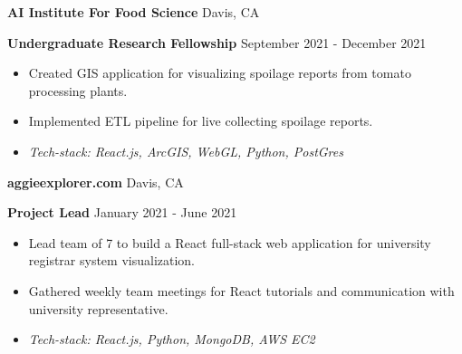 \documentclass[11pt]{article}
\begin{document}
\vspace{8pt}

\textbf{AI Institute For Food Science}	\hfill Davis, CA

\textbf{Undergraduate Research Fellowship} \hfill September 2021 - December 2021
\begin{itemize}[noitemsep, topsep=0pt, partopsep=0pt, parsep=0pt]
    \item Created GIS application for visualizing spoilage reports from tomato processing plants.
    \item Implemented ETL pipeline for live collecting spoilage reports.
    \item \textit{Tech-stack: React.js, ArcGIS, WebGL, Python, PostGres}
\end{itemize}

\vspace{8pt}

\textbf{aggieexplorer.com} \hfill Davis, CA

\textbf{Project Lead} \hfill January 2021 - June 2021
\begin{itemize}[noitemsep, topsep=0pt, partopsep=0pt, parsep=0pt]
    \item Lead team of 7 to build a React full-stack web application for university registrar system visualization.
    \item Gathered weekly team meetings for React tutorials and communication with university representative.
    \item \textit{Tech-stack: React.js, Python, MongoDB, AWS EC2}
\end{itemize}
\end{document}

